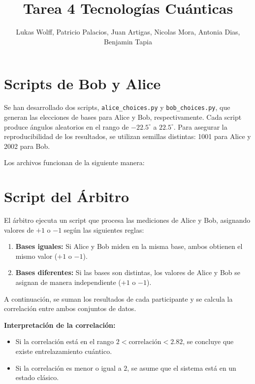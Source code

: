 \documentclass[11pt]{article}
\title{Tarea 4 Tecnologías Cuánticas}
\author{Lukas Wolff, 
        Patricio Palacios,
        Juan Artigas,
        Nicolas Mora,
        Antonia Dias,
        Benjamin Tapia}
\date{}
\begin{document}
\maketitle

\section{Scripts de Bob y Alice}

Se han desarrollado dos scripts, \texttt{alice\_choices.py} y \texttt{bob\_choices.py}, que generan las elecciones de bases para Alice y Bob, respectivamente. Cada script produce ángulos aleatorios en el rango de $-22.5^\circ$ a $22.5^\circ$. Para asegurar la reproducibilidad de los resultados, se utilizan semillas distintas: 1001 para Alice y 2002 para Bob.

Los archivos funcionan de la siguiente manera:

\section{Script del Árbitro}

El árbitro ejecuta un script que procesa las mediciones de Alice y Bob, asignando valores de $+1$ o $-1$ según las siguientes reglas:

\begin{enumerate}
    \item \textbf{Bases iguales:} Si Alice y Bob miden en la misma base, ambos obtienen el mismo valor ($+1$ o $-1$).
    \item \textbf{Bases diferentes:} Si las bases son distintas, los valores de Alice y Bob se asignan de manera independiente ($+1$ o $-1$).
\end{enumerate}

A continuación, se suman los resultados de cada participante y se calcula la correlación entre ambos conjuntos de datos.

\textbf{Interpretación de la correlación:}
\begin{itemize}
    \item Si la correlación está en el rango $2 < \text{correlación} < 2.82$, se concluye que existe entrelazamiento cuántico.
    \item Si la correlación es menor o igual a $2$, se asume que el sistema está en un estado clásico.
\end{itemize}
\end{document}
